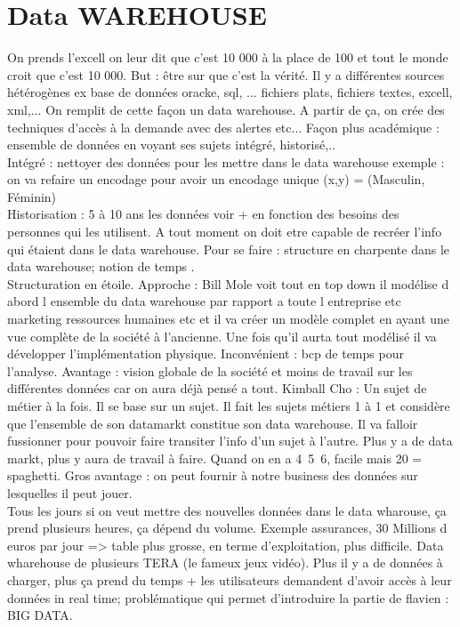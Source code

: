 \documentclass[10pt,a4paper]{article}
\begin{document}
\section{Data WAREHOUSE}
On prends l'excell on leur dit que c'est 10 000 à la place de 100 et tout le monde croit que c'est 10 000. But : être sur que c'est la vérité. Il y a différentes sources hétérogènes ex base de données oracke, sql, ... fichiers plats, fichiers textes, excell, xml,... On remplit de cette façon un data warehouse. A partir de ça, on crée des techniques d'accès à la demande avec des alertes etc... Façon plus académique : ensemble de données en voyant ses sujets intégré, historisé,..\\
Intégré : nettoyer des données pour les mettre dans le data warehouse exemple : on va refaire un encodage pour avoir un encodage unique (x,y) = (Masculin, Féminin)\\
Historisation : 5 à 10 ans les données voir + en fonction des besoins des personnes qui les utilisent. A tout moment on doit etre capable de recréer l'info qui étaient dans le data warehouse. Pour se faire : structure en charpente dans le data warehouse; notion de temps .\\ Structuration en étoile. Approche : Bill Mole voit tout en top down il modélise d abord l ensemble du data warehouse par rapport a toute l entreprise etc marketing ressources humaines etc et il va créer un modèle complet en ayant une vue complète de la société à l'ancienne. Une fois qu'il aurta tout modélisé il va développer l'implémentation physique. Inconvénient : bcp de temps pour l'analyse. Avantage : vision globale de la société et moins de travail sur les différentes données car on aura déjà pensé a tout. Kimball Cho : Un sujet de métier à la fois. Il se base sur un sujet. Il fait les sujets métiers 1 à 1 et considère que l'ensemble de son datamarkt constitue son data warehouse. Il va falloir fussionner pour pouvoir faire transiter l'info d'un sujet à l'autre. Plus y a de data markt, plus y aura de travail à faire. Quand on en a 4~5~6, facile mais 20 = spaghetti. Gros avantage : on peut fournir à notre business des données sur lesquelles il peut jouer. \\
Tous les jours si on veut mettre des nouvelles données dans le data wharouse, ça prend plusieurs heures, ça dépend du volume. Exemple assurances, 30 Millions d euros par jour => table plus grosse, en terme d'exploitation, plus difficile. Data wharehouse de plusieurs TERA (le fameux jeux vidéo). Plus il y a de données à charger, plus ça prend du temps + les utilisateurs demandent d'avoir accès à leur données in real time; problématique qui permet d'introduire la partie de flavien : BIG DATA.
\end{document}
